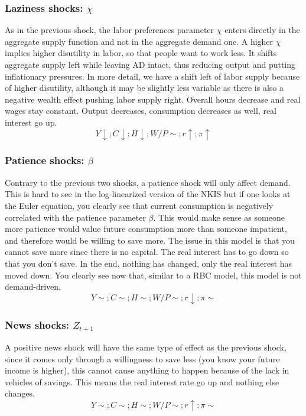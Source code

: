 \documentclass[12pt]{report}
\begin{document}
\subsubsection{Laziness shocks: $\chi$}

As in the previous shock, the labor preferences parameter $\chi$ enters directly in the aggregate supply function and not in the aggregate demand one. A higher $\chi$ implies higher disutility in labor, so that people want to work less. It shifts aggregate supply left while leaving AD intact, thus reducing output and putting inflationary pressures. In more detail, we have a shift left of labor supply because of higher disutility, although it may be slightly less variable as there is also a negative wealth effect pushing labor supply right. Overall hours decrease and real wages stay constant. Output decreases, consumption decreases as well, real interest go up. $$ Y\downarrow ; C\downarrow ; H\downarrow ; W/P\sim ; r\uparrow ; \pi\uparrow $$

\subsubsection{Patience shocks: $\beta$}

Contrary to the previous two shocks, a patience shock will only affect demand. This is hard to see in the log-linearized version of the NKIS but if one looks at the Euler equation, you clearly see that current consumption is negatively correlated with the patience parameter $\beta$. This would make sense as someone more patience would value future consumption more than someone impatient, and therefore would be willing to save more. The issue in this model is that you cannot save more since there is no capital. The real interest has to go down so that you don't save. In the end, nothing has changed, only the real interest has moved down. You clearly see now that, similar to a RBC model, this model is not demand-driven. $$ Y\sim ; C\sim ; H\sim ; W/P\sim ; r\downarrow ; \pi\sim $$

\subsubsection{News shocks: $Z_{t+1}$}

A positive news shock will have the same type of effect as the previous shock, since it comes only through a willingness to save less (you know your future income is higher), this cannot cause anything to happen because of the lack in vehicles of savings. This means the real interest rate go up and nothing else changes. $$ Y\sim ; C\sim ; H\sim ; W/P\sim ; r\uparrow ; \pi\sim $$
\end{document}
